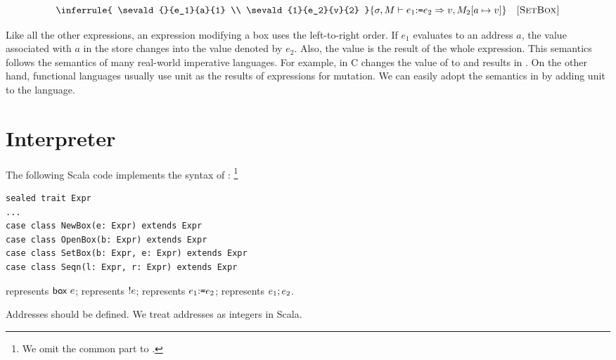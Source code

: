 
\vspace{-1em}

\[
  \inferrule
  {
    \sevald{}{e_1}{a}{1} \\
    \sevald{1}{e_2}{v}{2}
  }
  { \seval{\sigma}{M}{\eset{e_1}{e_2}}{v}{M_2[a\mapsto v]} }
  \quad\textsc{[SetBox]}
\]

Like all the other expressions, an expression modifying a box uses the left-to-right
order. If $e_1$ evaluates to an address $a$, the value associated with $a$ in
the store changes into the value denoted by $e_2$. Also, the value is the result
of the whole expression. This semantics follows the semantics of many real-world
imperative languages. For example,  in C changes the value of
 to  and results in . On the other hand, functional
languages usually use unit as the results of expressions for mutation. We can
easily adopt the semantics in \Lang by adding unit to the language.

\section{Interpreter}

The following Scala code implements the syntax of \Lang:
\footnote{We omit the common part to \plang.}

\begin{verbatim}
sealed trait Expr
...
case class NewBox(e: Expr) extends Expr
case class OpenBox(b: Expr) extends Expr
case class SetBox(b: Expr, e: Expr) extends Expr
case class Seqn(l: Expr, r: Expr) extends Expr
\end{verbatim}

 represents $\textsf{box}\ e$;
 represents $!e$;
 represents $e_1{:}\texttt{=} e_2$;
 represents $e_1;e_2$.

Addresses should be defined. We treat addresses as integers in Scala.

